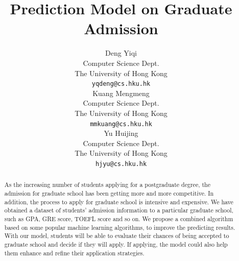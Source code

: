 \documentclass{article}
\title{Prediction Model on Graduate Admission}
\author{%
  Deng Yiqi\\
  Computer Science Dept. \\
  The University of Hong Kong\\
  \texttt{yqdeng@cs.hku.hk} \\
  \And
  Kuang Mengmeng \\
  Computer Science Dept. \\
  The University of Hong Kong\\
  \texttt{mmkuang@cs.hku.hk} \\
  \And
  Yu Huijing \\
  Computer Science Dept. \\
  The University of Hong Kong\\
  \texttt{hjyu@cs.hku.hk} \\
}
\begin{document}
\maketitle
\begin{abstract}
  As the increasing number of students applying for a postgraduate degree, the admission for graduate school has been getting more and more competitive. In addition, the process to apply for graduate school is intensive and expensive. We have obtained a dataset of students’ admission information to a particular graduate school, such as GPA, GRE score, TOEFL score and so on. We propose a combined algorithm based on some popular machine learning algorithms, to improve the predicting results. With our model, students will be able to evaluate their chances of being accepted to graduate school and decide if they will apply. If applying, the model could also help them enhance and refine their application strategies.
\end{abstract}
\end{document}
